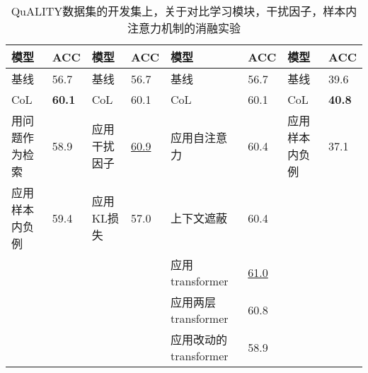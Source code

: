 \begin{table}[htbp]\scriptsize
    \centering
    \caption{QuALITY数据集的开发集上，关于对比学习模块，干扰因子，样本内注意力机制的消融实验}
    \begin{tabular}{ll|ll|ll|ll}
    \hline
    模型 & ACC & 模型 & ACC & 模型 & ACC & 模型 & ACC \\
    \hline
    基线 & 56.7 & 基线 & 56.7 & 基线 & 56.7 & 基线 & 39.6 \\
    \hline
    CoL & {\bfseries 60.1} & CoL & 60.1 & CoL & 60.1 & CoL & {\bfseries 40.8} \\
    \hline
    用问题作为检索 & 58.9 & 应用干扰因子 & \underline{60.9} & 应用自注意力 & 60.4 & 应用样本内负例 & 37.1 \\
    应用样本内负例 & 59.4 & 应用KL损失 & 57.0 & 上下文遮蔽 & 60.4 & \\
    & & & & 应用transformer & \underline{61.0} & & \\
    & & & & 应用两层transformer & 60.8 & & \\
    & & & & 应用改动的transformer & 58.9 & & \\
    \hline
    \end{tabular}
    \label{tab:4-4}
\end{table}
